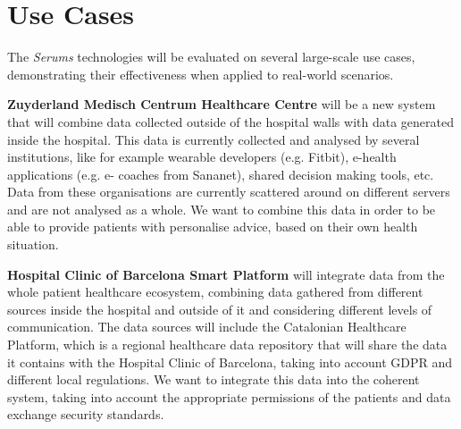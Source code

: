\documentclass[sigconf]{acmart}
\begin{document}
\section{Use Cases}
The \emph{Serums} technologies will be evaluated on several large-scale use cases, demonstrating their effectiveness when applied to real-world scenarios.

\textbf{Zuyderland Medisch Centrum Healthcare Centre} will be a new system that will combine data collected outside of the hospital walls with data generated inside the hospital. This data is currently collected and analysed by several institutions, like for example wearable developers (e.g. Fitbit), e-health applications (e.g. e- coaches from Sananet), shared decision making tools, etc. Data from these organisations are currently scattered around on different servers and are not analysed as a whole. We want to combine this data in order to be able to provide patients with personalise advice, based on their own health situation.

\textbf{Hospital Clinic of Barcelona Smart Platform} will integrate data from the whole patient healthcare ecosystem, combining data gathered from different sources inside the hospital and outside of it and considering different levels of communication. The data sources will include the Catalonian Healthcare Platform, which is a regional healthcare data repository that will share the data it contains with the Hospital Clinic of Barcelona, taking into account GDPR and different local regulations. We want to integrate this data into the coherent system, taking into account the appropriate permissions of the patients and data exchange security standards.

\end{document}
